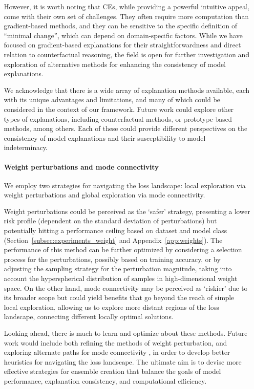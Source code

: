 However, it is worth noting that CEs, while providing a powerful intuitive appeal, come with their own set of challenges. They often require more computation than gradient-based methods, and they can be sensitive to the specific definition of ``minimal change'', which can depend on domain-specific factors. While we have focused on gradient-based explanations for their straightforwardness and direct relation to counterfactual reasoning, the field is open for further investigation and exploration of alternative methods for enhancing the consistency of model explanations.

We acknowledge that there is a wide array of explanation methods available, each with its unique advantages and limitations, and many of which could be considered in the context of our framework. Future work could explore other types of explanations, including counterfactual methods, or prototype-based methods, among others. Each of these could provide different perspectives on the consistency of model explanations and their susceptibility to model indeterminacy.

\paragraph{Weight perturbations and mode connectivity} We employ two strategies for navigating the loss landscape: local exploration via weight perturbations and global exploration via mode connectivity.

Weight perturbations could be perceived as the `safer' strategy, presenting a lower risk profile (dependent on the standard deviation of perturbations) but potentially hitting a performance ceiling based on dataset and model class (Section~\ref{subsec:experiments_weight} and Appendix~\ref{app:weights}). The performance of this method can be further optimized by considering a selection process for the perturbations, possibly based on training accuracy, or by adjusting the sampling strategy for the perturbation magnitude, taking into account the hyperspherical distribution of samples in high-dimensional weight space. On the other hand, mode connectivity may be perceived as `riskier' due to its broader scope but could yield benefits that go beyond the reach of simple local exploration, allowing us to explore more distant regions of the loss landscape, connecting different locally optimal solutions.

Looking ahead, there is much to learn and optimize about these methods. Future work would include both refining the methods of weight perturbation, and exploring alternate paths for mode connectivity \citep{ainsworth2023, gotmare2018, singh2020, tatro2020, zhao2020}, in order to develop better heuristics for navigating the loss landscape. The ultimate aim is to devise more effective strategies for ensemble creation that balance the goals of model performance, explanation consistency, and computational efficiency.

